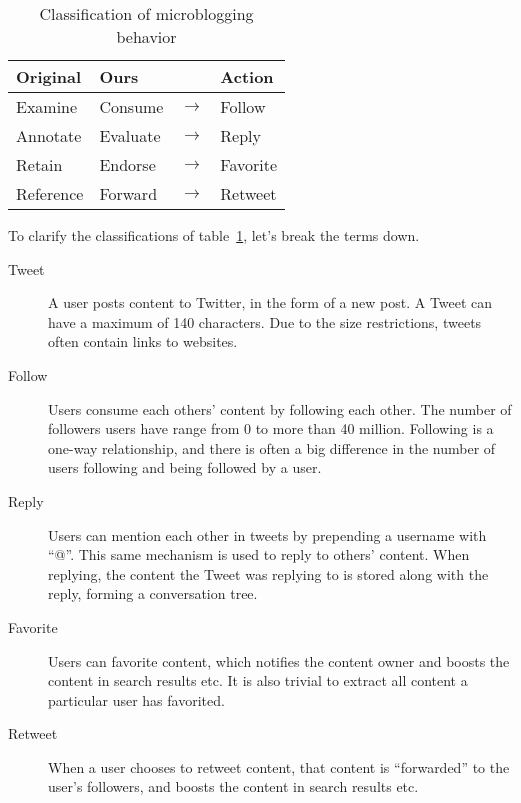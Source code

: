 \begin{table}[h]
  \begin{center}
    \begin{tabular}{|llcl|}
      \hline
      \textbf{Original} & \textbf{Ours} & & \textbf{Action} \\
      \hline
      Examine   & Consume  & $\rightarrow$ & Follow \\
      \hline
      Annotate  & Evaluate & $\rightarrow$ & Reply \\
      \hline
      Retain    & Endorse  & $\rightarrow$ & Favorite \\
      \hline
      Reference & Forward  & $\rightarrow$ & Retweet \\
      \hline
    \end{tabular}
  \end{center}
  \caption{Classification of microblogging behavior}
  \label{tab:behavior_class}
\end{table}

To clarify the classifications of table~\ref{tab:behavior_class}, let's break the terms down.

\begin{description}
  \item[Tweet]
    A user posts content to Twitter, in the form of a new post.
    A Tweet can have a maximum of 140 characters.
    Due to the size restrictions, tweets often contain links to websites.
  \item[Follow]
    Users consume each others' content by following each other.
    The number of followers users have range from 0 to more than 40 million.
    Following is a one-way relationship, and there is often a big difference in the number of users following and being followed by a user.
  \item[Reply]
    Users can mention each other in tweets by prepending a username with ``@''.
    This same mechanism is used to reply to others' content.
    When replying, the content the Tweet was replying to is stored along with the reply, forming a conversation tree.
  \item[Favorite]
    Users can favorite content, which notifies the content owner and boosts the content in search results etc.
    It is also trivial to extract all content a particular user has favorited.
  \item[Retweet]
    When a user chooses to retweet content, that content is ``forwarded'' to the user's followers, and boosts the content in search results etc.
\end{description}


